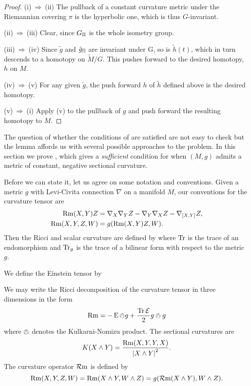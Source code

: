 \documentclass[a4paper,12pt]{amsart}
\begin{document}
\begin{proof}
(i)\(\ \Rightarrow\ \)(ii)
The pullback of a constant curvature metric under the Riemannian covering $\pi$ is the hyperbolic one, which is thus \(G\)-invariant.

(ii)\(\ \Rightarrow\ \)(iii)
Clear, since \(G_{\mathbb{H}}\) is the whole isometry group.

(iii)\(\ \Rightarrow\ \)(iv)
Since \(\tilde{g}\) and \(\tilde{g}_{\mathbb{H}}\) are invariant under G, so is \(\tilde{h}(t)\), which in turn descends to a homotopy on \(\tilde{M}/G\). This pushes forward to the desired homotopy, \(h\) on \(M\).

(iv)\(\ \Rightarrow\ \)(v)
For any given \(\tilde{g}\), the push forward \(h\) of \(\tilde{h}\) defined above is the desired homotopy.

(v)\(\ \Rightarrow\ \)(i)
Apply (v) to the pullback of \(g\) and push forward the resulting homotopy to \(M\).
\end{proof}

The question of whether the conditions of  are satisfied are not easy to check but the lemma affords us with several possible approaches to the problem. In this section we prove  , which gives a \emph{sufficient} condition for when \((M, g)\) admits a metric of constant, negative sectional curvature.

Before we can state it, let us agree on some notation and conventions. Given a metric \(g\) with Levi-Civita connection $\nabla$ on a manifold $M$, our conventions for the curvature tensor are
\[
\begin{split}
\operatorname{Rm}(X, Y) Z &= \nabla_X \nabla_Y Z - \nabla_Y \nabla_X Z - \nabla_{[X, Y]} Z, \\
\operatorname{Rm}(X, Y, Z, W) &= g(\operatorname{Rm}(X, Y) Z, W).
\end{split}
\]
Then the Ricci and scalar curvature are defined by
where $\operatorname{Tr}$ is the trace of an endomorphism and $\operatorname{Tr}_{g}$ is the trace of a bilinear form with respect to the metric $g$.

We define the Einstein tensor by

We may write the Ricci decomposition of the curvature tensor in three dimensions in the form
\[
\operatorname{Rm} = -\operatorname{E} \owedge g + \frac{\operatorname{Tr} \operatorname{\mathcal{E}}}{2} g \owedge g
\]
where \(\owedge\) denotes the Kulkarni-Nomizu product. The sectional curvatures are
\[
K(X \wedge Y) = \frac{\operatorname{Rm}(X, Y, Y, X)}{\left\lvert{X \wedge Y}\right\rvert^2}.
\]
The curvature operator \(\operatorname{\mathcal{R}m}\) is defined by
\[
\operatorname{Rm}(X, Y, Z, W) = \operatorname{Rm}(X \wedge Y, W \wedge Z) = g(\operatorname{\mathcal{R}m}(X \wedge Y), W \wedge Z).
\]
\end{document}
